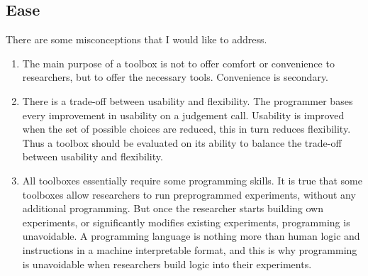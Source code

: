 \documentclass[preprint, 12pt]{elsarticle}
\begin{document}
\subsection{Ease}

There are some misconceptions that I would like to address. 
\begin{enumerate}
\item The main purpose of a toolbox is not to offer comfort or convenience to researchers, but to offer the necessary tools. Convenience is secondary.
\item There is a trade-off between usability and flexibility. The programmer bases every improvement in usability on a judgement call. Usability is improved when the set of possible choices are reduced, this in turn reduces flexibility. Thus a toolbox should be evaluated on its ability to balance the trade-off between usability and flexibility. 
\item All toolboxes essentially require some programming skills. It is true that some toolboxes allow researchers to run preprogrammed experiments, without any additional programming. But once the researcher starts building own experiments, or significantly modifies existing experiments, programming is unavoidable. A programming language is nothing more than human logic and instructions in a machine interpretable format, and this is why programming is unavoidable when researchers build logic into their experiments.
\end{enumerate}
\end{document}
